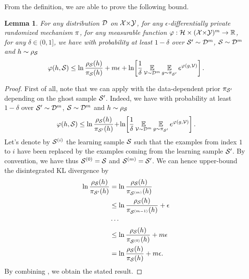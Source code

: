 \documentclass[twoside]{article}
\theoremstyle{plain}
\newtheorem{lemma}[theorem]{Lemma}
\begin{document}
From the definition, we are able to prove the following bound.
\begin{lemma}\label{lemma:general-disintegrated-differential-privacy}
For any distribution $\Dcal$ on $\Xcal{\times}\Ycal$, for any $\epsilon$-differentially private randomized mechanism $\P$, for any measurable function $\varphi: \Hcal\times(\Xcal{\times}\Ycal)^m\to \R$, for any $\delta\!\in\!(0, 1]$, we have with probability at least $1-\delta$ over $\Scal'\sim\Dcal^m$, $\Scal\sim\Dcal^m$ and $h\sim\AQ$
\begin{align*}
\varphi(h,\Scal) \le \ln\frac{\AQ(h)}{\P_{\Scal}(h)}+ m\epsilon + \ln\!\left[\frac{1}{\delta}\EE_{\Vcal\sim\Dcal^m}\EE_{g\sim\P_{\Scal'}}e^{\varphi(g,\Vcal)}\right].
\end{align*}
\end{lemma}
\begin{proof}
First of all, note that we can apply  with the data-dependent prior $\P_{\Scal'}$ depending on the ghost sample $\Scal'$.
Indeed, we have with probability at least $1-\delta$ over $\Scal'\sim\Dcal^m$, $\Scal\sim\Dcal^m$ and $h\sim\AQ$
\begin{align}
\varphi(h,\Scal) \le \ln\frac{\AQ(h)}{\P_{\Scal'}(h)}\!+\!\ln\!\left[\frac{1}{\delta}\EE_{\Vcal\sim\Dcal^m}\EE_{g\sim\P_{\Scal'}}e^{\varphi(g,\Vcal)}\right].\label{eq:proof-general-disintegrated-differential-privacy-1}
\end{align}
Let's denote by $\Scal^{(i)}$ the learning sample $\Scal$ such that the examples from index $1$ to $i$ have been replaced by the examples coming from the learning sample $\Scal'$.
By convention, we have thus $\Scal^{(0)}=\Scal$ and $\Scal^{(m)}=\Scal'$.
We can hence upper-bound the disintegrated KL divergence by 
\begin{align}
\ln\frac{\AQ(h)}{\P_{\Scal'}(h)} &= \ln\frac{\AQ(h)}{\P_{\Scal^{(m)}}(h)}\nonumber\\
&\le \ln\frac{\AQ(h)}{\P_{\Scal^{(m-1)}}(h)} + \epsilon\nonumber\\
&\dotsb\nonumber\\
&\le \ln\frac{\AQ(h)}{\P_{\Scal^{(0)}}(h)} + m\epsilon\nonumber\\
&= \ln\frac{\AQ(h)}{\P_{\Scal}(h)} + m\epsilon.\label{eq:proof-general-disintegrated-differential-privacy-2}
\end{align}
By combining , we obtain the stated result.
\end{proof}
\end{document}
